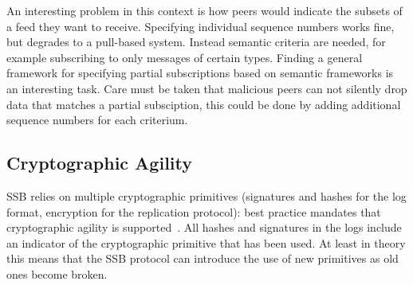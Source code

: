 \documentclass[9pt,sigconf,rewiew]{acmart}
\begin{document}
An interesting problem in this context is how peers would indicate the subsets of a feed they want to receive. Specifying individual sequence numbers works fine, but degrades to a pull-based system. Instead semantic criteria are needed, for example subscribing to only messages of certain types. Finding a general framework for specifying partial subscriptions based on semantic frameworks is an interesting task. Care must be taken that malicious peers can not silently drop data that matches a partial subsciption, this could be done by adding additional sequence numbers for each criterium.
%
%
%



\subsection{Cryptographic Agility}


SSB relies on multiple cryptographic primitives (signatures and hashes for the log format, encryption for the replication protocol): best practice mandates that cryptographic agility is supported~\cite{nelson2011crypto}. All hashes and signatures in the logs include an indicator of the cryptographic primitive that has been used. At least in theory this means that the SSB protocol can introduce the use of new primitives as old ones become broken.
\end{document}
